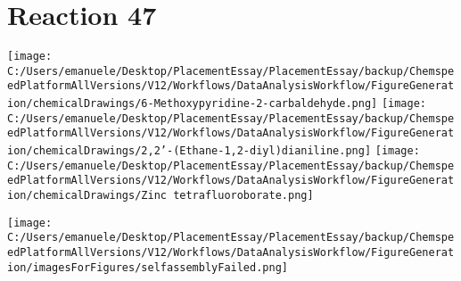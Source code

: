 \documentclass{article}%
\begin{document}
\section*{Reaction 47}%
%
\begin{scheme}[H]%
\begin{minipage}{0.5\textwidth}%
\texttt{[image: C:/Users/emanuele/Desktop/PlacementEssay/PlacementEssay/backup/ChemspeedPlatformAllVersions/V12/Workflows/DataAnalysisWorkflow/FigureGeneration/chemicalDrawings/6-Methoxypyridine-2-carbaldehyde.png]}%
\texttt{[image: C:/Users/emanuele/Desktop/PlacementEssay/PlacementEssay/backup/ChemspeedPlatformAllVersions/V12/Workflows/DataAnalysisWorkflow/FigureGeneration/chemicalDrawings/2,2'-(Ethane-1,2-diyl)dianiline.png]}%
\texttt{[image: C:/Users/emanuele/Desktop/PlacementEssay/PlacementEssay/backup/ChemspeedPlatformAllVersions/V12/Workflows/DataAnalysisWorkflow/FigureGeneration/chemicalDrawings/Zinc tetrafluoroborate.png]}%
\end{minipage}%
\begin{minipage}{0.5\textwidth}%
\begin{center}%
\texttt{[image: C:/Users/emanuele/Desktop/PlacementEssay/PlacementEssay/backup/ChemspeedPlatformAllVersions/V12/Workflows/DataAnalysisWorkflow/FigureGeneration/imagesForFigures/selfassemblyFailed.png]}%
\end{center}%
\end{minipage}%
\caption{Self-assembly of components 6, 20, with Zinc(II) in a 3.0:1.5:1.0 molar ratio in CH$_3$CN at 60\textdegree C for 40h. These are the reagents (starting materials) for reaction 47.}%
\end{scheme}%
\end{document}

